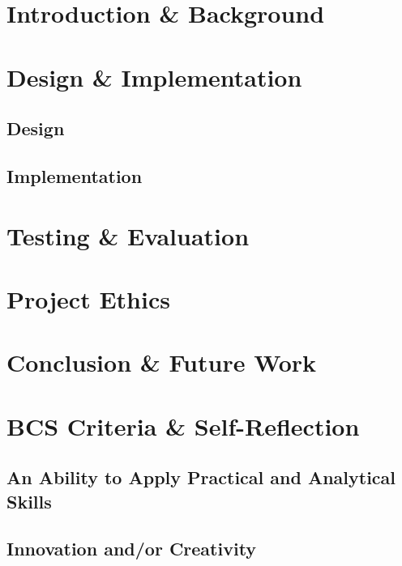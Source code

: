\documentclass[12pt]{article}
\begin{document}
\section{Introduction \& Background}



\section{Design \& Implementation}
\subsection{Design}


\subsection{Implementation}



\section{Testing \& Evaluation}

\section{Project Ethics}

\section{Conclusion \& Future Work}

\section{BCS Criteria \& Self-Reflection}

\subsection{An Ability to Apply Practical and Analytical Skills}

\subsection{Innovation and/or Creativity}
\end{document}
